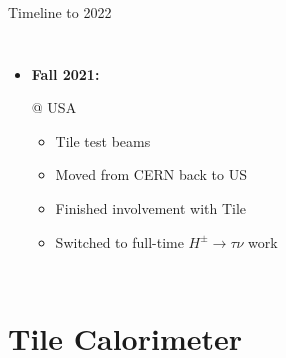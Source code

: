 \documentclass[aspectratio=169,xcolor=table]{beamer}
\newcommand{\Hp}{\ensuremath{H^{\pm}}\xspace}
\newcommand{\HpLong}{\ensuremath{\Hp \rightarrow \tau \nu}\xspace}
\begin{document}
\begin{frame}[t]{Timeline to 2022}
\begin{columns}
\begin{itemize}
          \item \textbf{Fall 2021: } {\footnotesize{@ USA
            \begin{itemize}
              \item Tile test beams
              \item Moved from CERN back to US
              \item Finished involvement with Tile
              \item Switched to full-time \HpLong work
            \end{itemize}}}


        \end{itemize}

    \end{columns}
  \end{frame}
    
\section{Tile Calorimeter }
\end{document}
